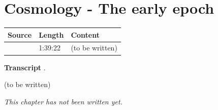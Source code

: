 \chapter{Cosmology - The early epoch}\label{ch:c20}
\begin{paracol}{2}

\begin{sources}
\begin{tabularx}{\linewidth}{@{}l l L@{}}
\toprule
\textbf{Source} & \textbf{Length} & \textbf{Content}\\
\midrule
{} & 1:39:22 & (to be written)\\
\bottomrule
\end{tabularx}

\smallskip
\textbf{Transcript} .
\end{sources}

\begin{reading}
(to be written)
\end{reading}

\emph{This chapter has not been written yet.}

\flushside
\end{paracol}
